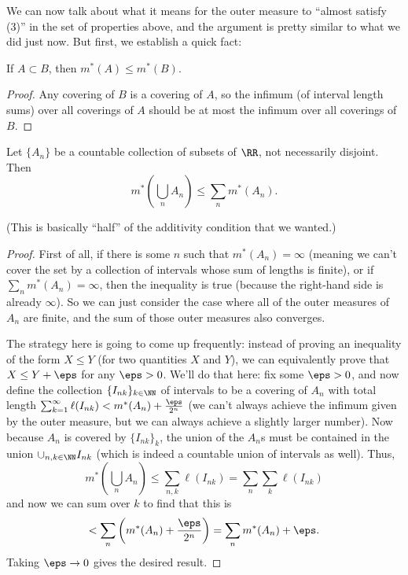 We can now talk about what it means for the outer measure to ``almost satisfy (3)'' in the set of properties above, and the argument is pretty similar to what we did just now. But first, we establish a quick fact:

\begin{lemma}
If $A \subset B$, then $m^\ast(A) \le m^\ast(B)$.
\end{lemma}
\begin{proof}
Any covering of $B$ is a covering of $A$, so the infimum (of interval length sums) over all coverings of $A$ should be at most the infimum over all coverings of $B$. 
\end{proof}

\begin{theorem}
Let $\{A_n\}$ be a countable collection of subsets of $\RR$, not necessarily disjoint. Then 
\[
    m^\ast\left(\bigcup_n A_n \right) \le \sum_n m^\ast(A_n).
\]  
\end{theorem}

(This is basically ``half'' of the additivity condition that we wanted.)

\begin{proof}
First of all, if there is some $n$ such that $m^\ast(A_n) = \infty$ (meaning we can't cover the set by a collection of intervals whose sum of lengths is finite), or if $\sum_n m^\ast(A_n) = \infty$, then the inequality is true (because the right-hand side is already $\infty$). So we can just consider the case where all of the outer measures of $A_n$ are finite, and the sum of those outer measures also converges. 

The strategy here is going to come up frequently: instead of proving an inequality of the form $X \le Y$ (for two quantities $X$ and $Y$), we can equivalently prove that $ X \le Y + \eps$ for any $\eps > 0$. We'll do that here: fix some $\eps > 0$, and now define the collection $\{I_{nk}\}_{k \in \NN}$ of intervals to be a covering of $A_n$ with total length $\sum_{k=1}^{\infty} \ell(I_{nk}) < m^\ast(A_n) + \frac{\eps}{2^n}$ (we can't always achieve the infimum given by the outer measure, but we can always achieve a slightly larger number). Now because $A_n$ is covered by $\{I_{nk}\}_k$, the union of the $A_n$s must be contained in the union $\cup_{n, k \in \NN} I_{nk}$ (which is indeed a countable union of intervals as well). Thus, 
\[
    m^\ast\left(\bigcup_{n} A_n\right) \le \sum_{n,k} \ell(I_{nk}) = \sum_n \sum_k \ell(I_{nk})
\]
and now we can sum over $k$ to find that this is
\[
    < \sum_n \left(m^\ast(A_n) + \frac{\eps}{2^n}\right) = \sum_n m^\ast(A_n) + \eps.
\]
Taking $\eps \to 0$ gives the desired result.
\end{proof}

